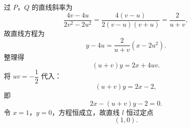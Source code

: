 \begin{answer}
过 $P$，$Q$ 的直线斜率为
\nopagebreak[4]
\[\frac{4v-4u}{2v^2-2u^2}
=\frac{4(v-u)}{2(v-u)(v+u)}
=\frac2{u+v},\]
故直线方程为
\nopagebreak[4]
\[y-4u=\frac2{u+v}(x-2u^2).\]
整理得
\nopagebreak[4]
\[(u+v)y=2x+4uv.\]
将 $uv=-\dfrac12$ 代入：
\nopagebreak[4]
\[(u+v)y=2x-2,\]
即
\nopagebreak[4]
\[2x-(u+v)y-2=0.\]
令 $x=1$，$y=0$，方程恒成立，故直线 $l$ 恒过定点
\nopagebreak[4]
\[(1,0).\]



\end{answer}
